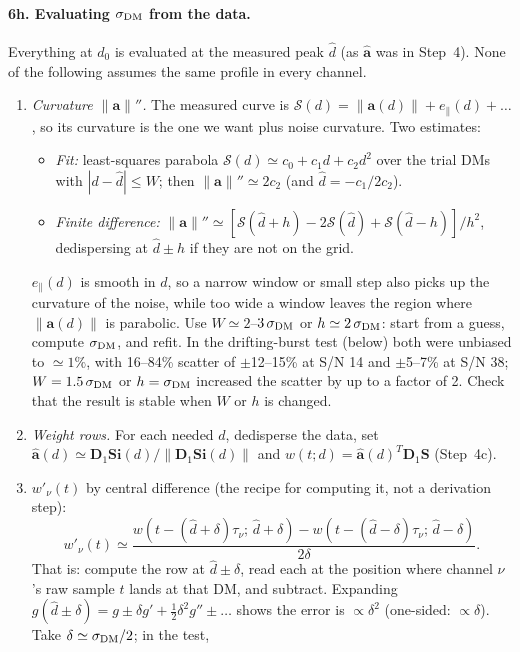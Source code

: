 \documentclass[11pt]{article}
\newcommand{\vb}[1]{\boldsymbol{#1}}
\newcommand{\Dn}{\vb D_1}
\newcommand{\Sm}{\vb S}
\newcommand{\ah}{\hat{\vb a}}
\newcommand{\nrm}[1]{\lVert #1\rVert}
\newcommand{\Sc}{\mathcal S}
\newcommand{\ep}{e_\parallel}
\newcommand{\tch}{\tau_{\nu}}
\begin{document}
\paragraph{6h. Evaluating $\sigma_{\rm DM}$ from the data.}
Everything at $d_0$ is evaluated at the measured peak $\hat d$ (as $\ah$ was in Step~4). None of the following
assumes the same profile in every channel.
\begin{enumerate}
\item \emph{Curvature $\nrm{\vb a}''$.} The measured curve is $\Sc(d)=\nrm{\vb a(d)}+\ep(d)+\ldots$, so its
curvature is the one we want plus noise curvature. Two estimates:
\begin{itemize}
\item \emph{Fit:} least-squares parabola $\Sc(d)\simeq c_0+c_1d+c_2d^{2}$ over the trial DMs with
$|d-\hat d|\le W$; then $\nrm{\vb a}''\simeq2c_2$ (and $\hat d=-c_1/2c_2$).
\item \emph{Finite difference:} $\nrm{\vb a}''\simeq[\Sc(\hat d+h)-2\Sc(\hat d)+\Sc(\hat d-h)]/h^{2}$,
dedispersing at $\hat d\pm h$ if they are not on the grid.
\end{itemize}
$\ep(d)$ is smooth in $d$, so a narrow window or small step also picks up the curvature of the noise, while
too wide a window leaves the region where $\nrm{\vb a(d)}$ is parabolic. Use $W\simeq2$--$3\,\sigma_{\rm DM}$ or
$h\simeq2\,\sigma_{\rm DM}$: start from a guess, compute $\sigma_{\rm DM}$, and refit. In the drifting-burst
test (below) both were unbiased to $\simeq1\%$, with 16--84\% scatter of $\pm$12--15\% at S/N 14 and
$\pm$5--7\% at S/N 38; $W=1.5\,\sigma_{\rm DM}$ or $h=\sigma_{\rm DM}$ increased the scatter by up to a factor of 2.
Check that the result is stable when $W$ or $h$ is changed.
\item \emph{Weight rows.} For each needed $d$, dedisperse the data, set $\ah(d)\simeq\Dn\Sm\vb i(d)/\nrm{\Dn\Sm\vb i(d)}$
and $w(t;d)=\ah(d)^{T}\Dn\Sm$ (Step~4c).
\item \emph{$w'_{\nu}(t)$} by central difference (the recipe for computing it, not a derivation step):
\begin{equation}
w'_{\nu}(t)\simeq\frac{w(t-(\hat d+\delta)\tch;\,\hat d+\delta)-w(t-(\hat d-\delta)\tch;\,\hat d-\delta)}{2\delta}.
\end{equation}
That is: compute the row at $\hat d\pm\delta$, read each at the position where channel $\nu$'s raw sample $t$
lands at that DM, and subtract. Expanding $g(\hat d\pm\delta)=g\pm\delta g'+\tfrac12\delta^{2}g''\pm\ldots$ shows
the error is $\propto\delta^{2}$ (one-sided: $\propto\delta$). Take $\delta\simeq\sigma_{\rm DM}/2$; in the test,

\end{enumerate}
\end{document}

